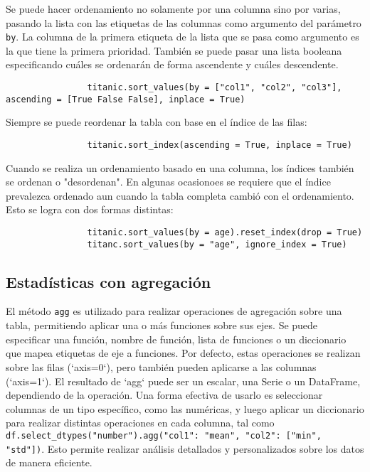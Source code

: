             \noindent Se puede hacer ordenamiento no solamente por una columna sino por varias, pasando la lista con las etiquetas de las columnas como argumento del parámetro \texttt{by}. La columna de la primera etiqueta de la lista que se pasa como argumento es la que tiene la primera prioridad. También se puede pasar una lista booleana especificando cuáles se ordenarán de forma ascendente y cuáles descendente.
            \begin{verbatim}
                titanic.sort_values(by = ["col1", "col2", "col3"], ascending = [True False False], inplace = True)
            \end{verbatim}
            \noindent Siempre se puede reordenar la tabla con base en el índice de las filas:
            \begin{verbatim}
                titanic.sort_index(ascending = True, inplace = True)
            \end{verbatim}
            Cuando se realiza un ordenamiento basado en una columna, los índices también se ordenan o "desordenan". En algunas ocasionoes se requiere que el índice prevalezca ordenado aun cuando la tabla completa cambió con el ordenamiento. Esto se logra con dos formas distintas:
            \begin{verbatim}
                titanic.sort_values(by = age).reset_index(drop = True)
                titanc.sort_values(by = "age", ignore_index = True)
            \end{verbatim}

        \subsection{Estadísticas con agregación}

            El método \texttt{agg} es utilizado para realizar operaciones de agregación sobre una tabla, permitiendo aplicar una o más funciones sobre sus ejes. Se puede especificar una función, nombre de función, lista de funciones o un diccionario que mapea etiquetas de eje a funciones. Por defecto, estas operaciones se realizan sobre las filas (`axis=0`), pero también pueden aplicarse a las columnas (`axis=1`). El resultado de `agg` puede ser un escalar, una Serie o un DataFrame, dependiendo de la operación. Una forma efectiva de usarlo es seleccionar columnas de un tipo específico, como las numéricas, y luego aplicar un diccionario para realizar distintas operaciones en cada columna, tal como \texttt{df.select\_dtypes("number").agg({"col1": "mean", "col2": ["min", "std"]})}. Esto permite realizar análisis detallados y personalizados sobre los datos de manera eficiente.

